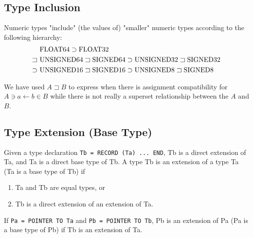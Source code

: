\documentclass[a4wide,11pt]{article}
\newcommand{\SIGNED}{\lstinline"SIGNED"}
\newcommand{\UNSIGNED}{\lstinline"UNSIGNED"}
\newcommand{\FLOAT}{\lstinline"FLOAT"}
\begin{document}
\subsection{Type Inclusion}
Numeric types "include" (the values of) "smaller" numeric types according to the following hierarchy:
\begin{align*}
	& \FLOAT64 \supset \FLOAT32 \\
	\sqsupset\ & \UNSIGNED64 \sqsupset \SIGNED64
	\supset \UNSIGNED32 \sqsupset \SIGNED32 \\
	\supset\ & \UNSIGNED16 \sqsupset \SIGNED16
	\supset \UNSIGNED8 \sqsupset \SIGNED8
\end{align*}

We have used $A \sqsupset B$ to express when there is assignment compatibility for $A \ni a \leftarrow b \in B$ while there is not really a superset relationship between the $A$ and $B$.

\subsection{Type Extension (Base Type)}
Given a type declaration \lstinline"Tb = RECORD (Ta) ... END", Tb is a direct extension of Ta, and Ta is a direct base type of Tb. A type Tb is an extension of a type Ta (Ta is a base type of Tb) if
\begin{enumerate}
\item Ta and Tb are equal types, or
\item Tb is a direct extension of an extension of Ta.
\end{enumerate}
If \lstinline"Pa = POINTER TO Ta" and \lstinline"Pb = POINTER TO Tb", Pb is an extension of Pa (Pa is a base type of Pb) if Tb is an extension of Ta.
\end{document}
